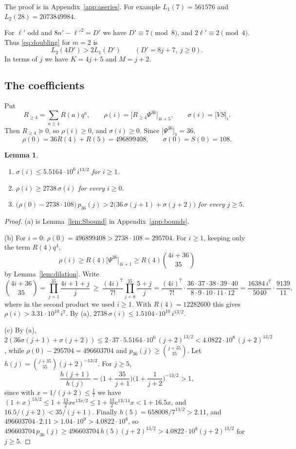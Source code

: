 \documentclass[11pt]{amsart}
\newtheorem{lemma}[theorem]{Lemma}
\theoremstyle{definition}
\newcommand{\coef}[2]{\big[#1\big]_{#2}}
\begin{document}
The proof is in Appendix~\ref{app:qseries}. For example $L_1(7)=561576$ and $L_2(28)=2073849984$.

For $\ell'$ odd and $8n'-\ell'^2=D'$ we have $D'\equiv7\pmod8$, and $2\ell'\equiv2\pmod4$. Thus \eqref{eq:doubling} for $m=2$ is
\begin{equation}\label{eq:I2}
L_2(4D')>2L_1(D')\qquad(D'=8j+7,\ j\ge0).
\end{equation}
In terms of $j$ we have $K=4j+5$ and $M=j+2$.

\subsection{The coefficients}
Put
\[
R_{\ge4}=\sum_{a\ge4}R(a)q^a,\qquad \rho(i)=\coef{R_{\ge4}\Psi^{36}}{4i+5},\qquad \sigma(i)=\coef{VS}{i}.
\]
Then $R_{\ge4}\succeq0$, so $\rho(i)\ge0$, and $\sigma(i)\ge0$. Since $\coef{\Psi^{36}}1=36$,
\[
\rho(0)=36R(4)+R(5)=496899408,\qquad \sigma(0)=S(0)=108.
\]

\begin{lemma}\label{lem:m2bounds}
\begin{enumerate}
\item[(a)] $\sigma(i)\le5.5164\cdot10^6\,i^{13/2}$ for $i\ge1$.
\item[(b)] $\rho(i)\ge2738\,\sigma(i)$ for every $i\ge0$.
\item[(c)] $\big(\rho(0)-2738\cdot108\big)\,p_{36}(j)>2\big(36\,\sigma(j+1)+\sigma(j+2)\big)$ for every $j\ge5$.
\end{enumerate}
\end{lemma}

\begin{proof}
(a) is Lemma~\ref{lem:Sbound} in Appendix~\ref{app:bounds}.

(b) For $i=0$: $\rho(0)=496899408>2738\cdot108=295704$. For $i\ge1$, keeping only the term $R(4)q^4$,
\[
\rho(i)\ge R(4)\coef{\Psi^{36}}{4i+1}\ge R(4)\binom{4i+36}{35}
\]
by Lemma~\ref{lem:dilation}. Write
\[
\binom{4i+36}{35}=\prod_{j=1}^{35}\frac{4i+1+j}j\ \ge\ \frac{(4i)^7}{7!}\prod_{j=8}^{35}\frac{5+j}j=\frac{(4i)^7}{7!}\cdot\frac{36\cdot37\cdot38\cdot39\cdot40}{8\cdot9\cdot10\cdot11\cdot12}=\frac{16384\,i^7}{5040}\cdot\frac{9139}{11},
\]
where in the second product we used $i\ge1$. With $R(4)=12282600$ this gives $\rho(i)>3.31\cdot10^{10}\,i^7$. By (a), $2738\,\sigma(i)\le1.5104\cdot10^{10}\,i^{13/2}$.

(c) By (a), $2(36\sigma(j+1)+\sigma(j+2))\le2\cdot37\cdot5.5164\cdot10^6\,(j+2)^{13/2}<4.0822\cdot10^8\,(j+2)^{13/2}$, while $\rho(0)-295704=496603704$ and $p_{36}(j)\ge\binom{j+35}{35}$. Let $h(j)=\binom{j+35}{35}(j+2)^{-13/2}$. For $j\ge5$,
\[
\frac{h(j+1)}{h(j)}=\Big(1+\frac{35}{j+1}\Big)\Big(1+\frac1{j+2}\Big)^{-13/2}>1,
\]
since with $x=1/(j+2)\le\frac17$ we have $(1+x)^{13/2}\le1+\tfrac{13}2xe^{13x/2}\le1+\tfrac{13}2e^{13/14}x<1+16.5x$, and $16.5/(j+2)<35/(j+1)$. Finally $h(5)=658008/7^{13/2}>2.11$, and $496603704\cdot2.11>1.04\cdot10^9>4.0822\cdot10^8$, so $496603704\,p_{36}(j)\ge496603704\,h(5)(j+2)^{13/2}>4.0822\cdot10^8(j+2)^{13/2}$ for $j\ge5$.
\end{proof}
\end{document}
